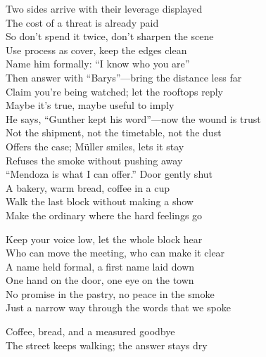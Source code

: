 \begin{lyrics}
Two sides arrive with their leverage displayed\\
The cost of a threat is already paid\\
So don’t spend it twice, don’t sharpen the scene\\
Use process as cover, keep the edges clean\\
Name him formally: “I know who you are”\\
Then answer with “Barys”—bring the distance less far\\
Claim you’re being watched; let the rooftops reply\\
Maybe it’s true, maybe useful to imply\\
He says, “Gunther kept his word”—now the wound is trust\\
Not the shipment, not the timetable, not the dust\\
Offers the case; Müller smiles, lets it stay\\
Refuses the smoke without pushing away\\
“Mendoza is what I can offer.” Door gently shut\\
A bakery, warm bread, coffee in a cup\\
Walk the last block without making a show\\
Make the ordinary where the hard feelings go

Keep your voice low, let the whole block hear\\
Who can move the meeting, who can make it clear\\
A name held formal, a first name laid down\\
One hand on the door, one eye on the town\\
No promise in the pastry, no peace in the smoke\\
Just a narrow way through the words that we spoke

Coffee, bread, and a measured goodbye\\
The street keeps walking; the answer stays dry
\end{lyrics}

